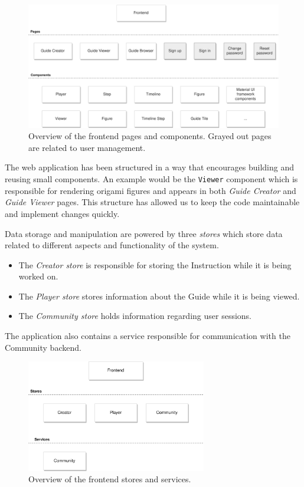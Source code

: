 \begin{figure}[H]
  \caption{Overview of the frontend pages and components. Grayed out pages are related to user management.}
  \centering
    \includegraphics[width=\textwidth]{assets/3-frontend-architecture.png}
\end{figure}

The web application has been structured in a way that encourages building and reusing small components. An example would be the \texttt{Viewer} component which is responsible for rendering origami figures and appears in both \textit{Guide Creator} and \textit{Guide Viewer} pages. This structure has allowed us to keep the code maintainable and implement changes quickly.

\medskip

Data storage and manipulation are powered by three \textit{stores} which store data related to different aspects and functionality of the system.

\begin{itemize}
	\item The \textit{Creator store} is responsible for storing the Instruction while it is being worked on.
	\item The \textit{Player store} stores information about the Guide while it is being viewed.
	\item The \textit{Community store} holds information regarding user sessions.
\end{itemize}

The application also contains a service responsible for communication with the Community backend.

\begin{figure}[H]
  \caption{Overview of the frontend stores and services.}
  \centering
    \includegraphics[width=0.7\textwidth]{assets/3-frontend-stores-services.png}
\end{figure}


